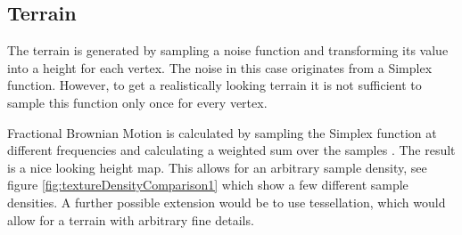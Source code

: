 \newpage
\subsection{Terrain}
The terrain is generated by sampling a noise function and transforming its value into a height for each vertex. The noise in this case originates from a Simplex function. However, to get a realistically looking terrain it is not sufficient to sample this function only once for every vertex.

Fractional Brownian Motion is calculated by sampling the Simplex function at different frequencies and calculating a weighted sum over the samples \cite{FracBrownMotion}. The result is a nice looking height map. This allows for an arbitrary sample density, see figure \ref{fig:textureDensityComparison1} which show a few different sample densities. A further possible extension would be to use tessellation, which would allow for a terrain with arbitrary fine details.  

